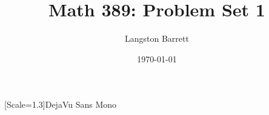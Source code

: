 \documentclass{article}
\begin{document}
\title{Math 389: Problem Set 1}
\author{Langston Barrett}
\date{\today}
\maketitle
\newfontfamily{\lstsansserif}[Scale=1.3]{DejaVu Sans Mono} %
\lstset{showstringspaces=\false}



\newpage

\end{document}
